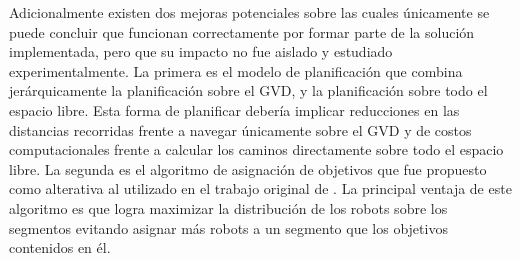 Adicionalmente existen dos mejoras potenciales sobre las cuales únicamente se
puede concluir que funcionan correctamente por formar parte de la solución
implementada, pero que su impacto no fue aislado y estudiado experimentalmente.
La primera es el modelo de planificación que combina jerárquicamente la
planificación sobre el GVD, y la planificación sobre todo el espacio libre.
Esta forma de planificar debería implicar reducciones en las distancias
recorridas frente a navegar únicamente sobre el GVD y de costos computacionales
frente a calcular los caminos directamente sobre todo el espacio libre. La
segunda es el algoritmo de asignación de objetivos que fue propuesto como
alterativa al utilizado en el trabajo original de \cite{wurm2008coordinated}.
La principal ventaja de este algoritmo es que logra maximizar la distribución
de los robots sobre los segmentos evitando asignar más robots a un segmento que
los objetivos contenidos en él.














